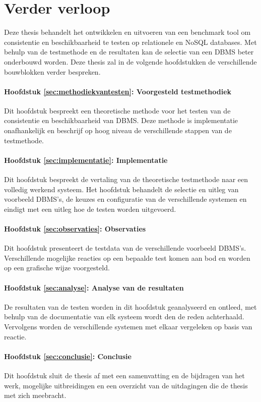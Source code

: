 \section{Verder verloop}
Deze thesis behandelt het ontwikkelen en uitvoeren van een benchmark tool om consistentie en beschikbaarheid te testen op relationele en NoSQL databases. Met behulp van de testmethode en de resultaten kan de selectie van een DBMS beter onderbouwd worden. Deze thesis zal in de volgende hoofdstukken de verschillende bouwblokken verder bespreken. 

\paragraph{Hoofdstuk \ref{sec:methodiekvantesten}: Voorgesteld testmethodiek} Dit hoofdstuk bespreekt een theoretische methode voor het testen van de consistentie en beschikbaarheid van DBMS. Deze methode is implementatie onafhankelijk en beschrijf op hoog niveau de verschillende stappen van de testmethode. 

\paragraph{Hoofdstuk \ref{sec:implementatie}: Implementatie} Dit hoofdstuk bespreekt de vertaling van de theoretische testmethode naar een volledig werkend systeem. Het hoofdstuk behandelt de selectie en uitleg van voorbeeld DBMS's, de keuzes en configuratie van de verschillende systemen en eindigt met een uitleg hoe de testen worden uitgevoerd.

\paragraph{Hoofdstuk \ref{sec:observaties}: Observaties} Dit hoofdstuk presenteert de testdata van de verschillende voorbeeld DBMS's. Verschillende mogelijke reacties op een bepaalde test komen aan bod en worden op een grafische wijze voorgesteld. 

\paragraph{Hoofdstuk \ref{sec:analyse}: Analyse van de resultaten} De resultaten van de testen worden in dit hoofdstuk geanalyseerd en ontleed, met behulp van de documentatie van elk systeem wordt den de reden achterhaald. Vervolgens worden de verschillende systemen met elkaar vergeleken op basis van reactie. 

\paragraph{Hoofdstuk \ref{sec:conclusie}: Conclusie} Dit hoofdstuk sluit de thesis af met een samenvatting en de bijdragen van het werk, mogelijke uitbreidingen en een overzicht van de uitdagingen die de thesis met zich meebracht. 
